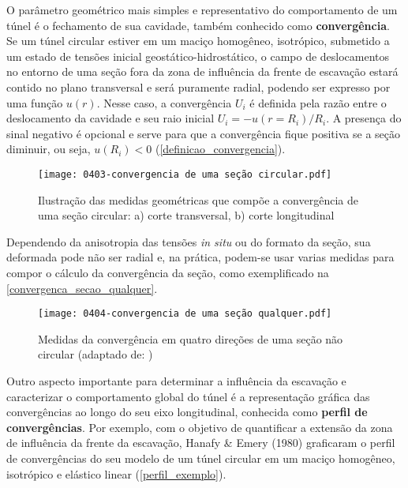 O parâmetro geométrico mais simples e representativo do comportamento de um túnel é o fechamento de sua cavidade, também conhecido como \textbf{convergência}. Se um túnel circular estiver em um maciço homogêneo, isotrópico, submetido a um estado de tensões inicial geostático-hidrostático, o campo de deslocamentos no entorno de uma seção fora da zona de influência da frente de escavação estará contido no plano transversal e será puramente radial, podendo ser expresso por uma função  $u(r)$. Nesse caso, a convergência $U_i$ é definida pela razão entre o deslocamento da cavidade e seu raio inicial $U_i=-u(r=R_i)/R_i$. A presença do sinal negativo é opcional e serve para que a convergência fique positiva se a seção diminuir, ou seja, $u(R_i) < 0$  (\autoref{definicao_convergencia}).

\begin{figure}[H]
	\begin{center}
		\texttt{[image: 0403-convergencia de uma seção circular.pdf]}
	\end{center}
	\caption{\label{definicao_convergencia}Ilustração das medidas geométricas que compõe a convergência de uma seção circular: a) corte transversal, b) corte longitudinal}
\end{figure}

Dependendo da anisotropia das tensões \textit{in situ} ou do formato da seção, sua deformada pode não ser radial e, na prática, podem-se usar varias medidas para compor o cálculo da convergência da seção, como exemplificado na \autoref{convergenca_secao_qualquer}.

\begin{figure}[H]
	\begin{center}
		\texttt{[image: 0404-convergencia de uma seção qualquer.pdf]}
	\end{center}
	\caption{\label{convergenca_secao_qualquer}Medidas da convergência em quatro direções de uma seção não circular (adaptado de: )}
\end{figure}

Outro aspecto importante para determinar a influência da escavação e caracterizar o comportamento global do túnel é a representação gráfica das convergências ao longo do seu eixo longitudinal, conhecida como \textbf{perfil de convergências}. Por exemplo, com o objetivo de quantificar a extensão da zona de influência da frente da escavação, Hanafy \& Emery (1980) graficaram o perfil de convergências do seu modelo de um túnel circular em um maciço homogêneo, isotrópico e elástico linear (\autoref{perfil_exemplo}).

